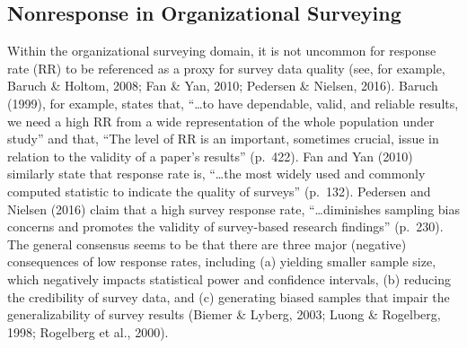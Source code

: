 \documentclass[
  man,mask]{apa7}
\begin{document}
\hypertarget{nonresponse-in-organizational-surveying}{%
\subsection{Nonresponse in Organizational Surveying}\label{nonresponse-in-organizational-surveying}}

Within the organizational surveying domain, it is not uncommon for response rate (RR) to be referenced as a proxy for survey data quality (see, for example, Baruch \& Holtom, 2008; Fan \& Yan, 2010; Pedersen \& Nielsen, 2016). Baruch (1999), for example, states that, ``\ldots to have dependable, valid, and reliable results, we need a high RR from a wide representation of the whole population under study'' and that, ``The level of RR is an important, sometimes crucial, issue in relation to the validity of a paper's results'' (p.~422). Fan and Yan (2010) similarly state that response rate is, ``\ldots the most widely used and commonly computed statistic to indicate the quality of surveys'' (p.~132). Pedersen and Nielsen (2016) claim that a high survey response rate, ``\ldots diminishes sampling bias concerns and promotes the validity of survey-based research findings'' (p.~230). The general consensus seems to be that there are three major (negative) consequences of low response rates, including (a) yielding smaller sample size, which negatively impacts statistical power and confidence intervals, (b) reducing the credibility of survey data, and (c) generating biased samples that impair the generalizability of survey results (Biemer \& Lyberg, 2003; Luong \& Rogelberg, 1998; Rogelberg et al., 2000).
\end{document}
